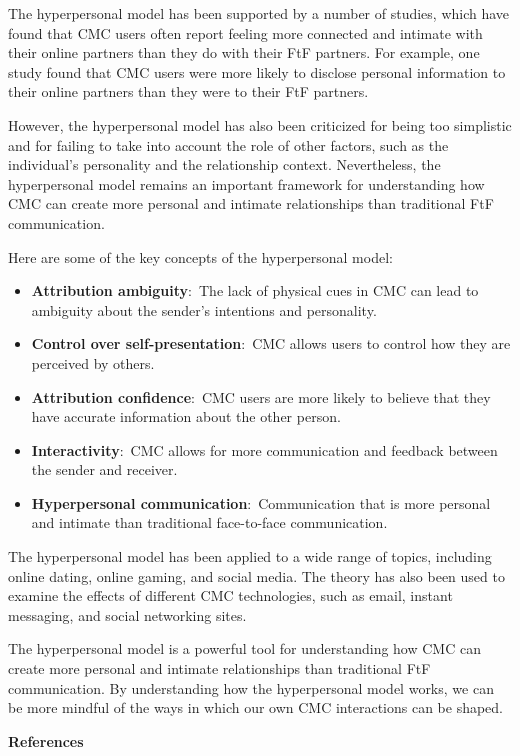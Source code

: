 \documentclass[
  b5paper]{book}
\begin{document}
The hyperpersonal model has been supported by a number of studies, which have found that CMC users often report feeling more connected and intimate with their online partners than they do with their FtF partners. For example, one study found that CMC users were more likely to disclose personal information to their online partners than they were to their FtF partners.

However, the hyperpersonal model has also been criticized for being too simplistic and for failing to take into account the role of other factors, such as the individual's personality and the relationship context. Nevertheless, the hyperpersonal model remains an important framework for understanding how CMC can create more personal and intimate relationships than traditional FtF communication.

Here are some of the key concepts of the hyperpersonal model:

\begin{itemize}
\item
  \textbf{Attribution ambiguity}:~The lack of physical cues in CMC can lead to ambiguity about the sender's intentions and personality.
\item
  \textbf{Control over self-presentation}:~CMC allows users to control how they are perceived by others.
\item
  \textbf{Attribution confidence}:~CMC users are more likely to believe that they have accurate information about the other person.
\item
  \textbf{Interactivity}:~CMC allows for more communication and feedback between the sender and receiver.
\item
  \textbf{Hyperpersonal communication}:~Communication that is more personal and intimate than traditional face-to-face communication.
\end{itemize}

The hyperpersonal model has been applied to a wide range of topics, including online dating, online gaming, and social media. The theory has also been used to examine the effects of different CMC technologies, such as email, instant messaging, and social networking sites.

The hyperpersonal model is a powerful tool for understanding how CMC can create more personal and intimate relationships than traditional FtF communication. By understanding how the hyperpersonal model works, we can be more mindful of the ways in which our own CMC interactions can be shaped.

\textbf{References}
\end{document}
